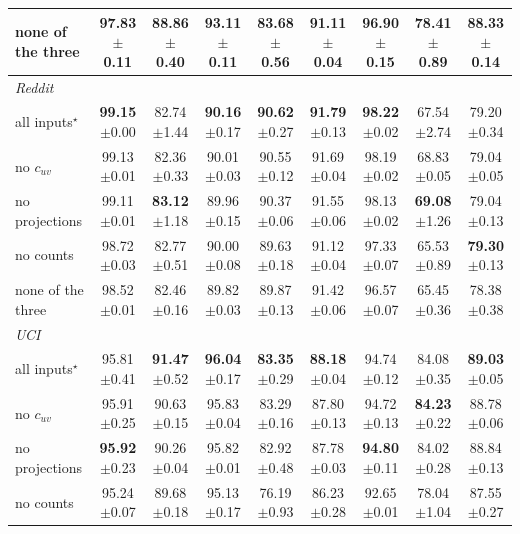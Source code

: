 \begin{table}[p]
\begin{tabular}{lcccccccc}
none of the three & 97.83{\tiny$\pm$0.11} & 88.86{\tiny$\pm$0.40} & 93.11{\tiny$\pm$0.11} & 83.68{\tiny$\pm$0.56} & 91.11{\tiny$\pm$0.04} & 96.90{\tiny$\pm$0.15} & 78.41{\tiny$\pm$0.89} & 88.33{\tiny$\pm$0.14} \\
\midrule
\multicolumn{9}{l}{\textit{Reddit}} \\
all inputs$^\star$ & \textbf{99.15}{\tiny$\pm$0.00} & 82.74{\tiny$\pm$1.44} & \textbf{90.16}{\tiny$\pm$0.17} & \textbf{90.62}{\tiny$\pm$0.27} & \textbf{91.79}{\tiny$\pm$0.13} & \textbf{98.22}{\tiny$\pm$0.02} & 67.54{\tiny$\pm$2.74} & 79.20{\tiny$\pm$0.34} \\
no $c_{uv}$ & 99.13{\tiny$\pm$0.01} & 82.36{\tiny$\pm$0.33} & 90.01{\tiny$\pm$0.03} & 90.55{\tiny$\pm$0.12} & 91.69{\tiny$\pm$0.04} & 98.19{\tiny$\pm$0.02} & 68.83{\tiny$\pm$0.05} & 79.04{\tiny$\pm$0.05} \\
no projections & 99.11{\tiny$\pm$0.01} & \textbf{83.12}{\tiny$\pm$1.18} & 89.96{\tiny$\pm$0.15} & 90.37{\tiny$\pm$0.06} & 91.55{\tiny$\pm$0.06} & 98.13{\tiny$\pm$0.02} & \textbf{69.08}{\tiny$\pm$1.26} & 79.04{\tiny$\pm$0.13} \\
no counts & 98.72{\tiny$\pm$0.03} & 82.77{\tiny$\pm$0.51} & 90.00{\tiny$\pm$0.08} & 89.63{\tiny$\pm$0.18} & 91.12{\tiny$\pm$0.04} & 97.33{\tiny$\pm$0.07} & 65.53{\tiny$\pm$0.89} & \textbf{79.30}{\tiny$\pm$0.13} \\
none of the three & 98.52{\tiny$\pm$0.01} & 82.46{\tiny$\pm$0.16} & 89.82{\tiny$\pm$0.03} & 89.87{\tiny$\pm$0.13} & 91.42{\tiny$\pm$0.06} & 96.57{\tiny$\pm$0.07} & 65.45{\tiny$\pm$0.36} & 78.38{\tiny$\pm$0.38} \\
\midrule
\multicolumn{9}{l}{\textit{UCI}} \\
all inputs$^\star$ & 95.81{\tiny$\pm$0.41} & \textbf{91.47}{\tiny$\pm$0.52} & \textbf{96.04}{\tiny$\pm$0.17} & \textbf{83.35}{\tiny$\pm$0.29} & \textbf{88.18}{\tiny$\pm$0.04} & 94.74{\tiny$\pm$0.12} & 84.08{\tiny$\pm$0.35} & \textbf{89.03}{\tiny$\pm$0.05} \\
no $c_{uv}$ & 95.91{\tiny$\pm$0.25} & 90.63{\tiny$\pm$0.15} & 95.83{\tiny$\pm$0.04} & 83.29{\tiny$\pm$0.16} & 87.80{\tiny$\pm$0.13} & 94.72{\tiny$\pm$0.13} & \textbf{84.23}{\tiny$\pm$0.22} & 88.78{\tiny$\pm$0.06} \\
no projections & \textbf{95.92}{\tiny$\pm$0.23} & 90.26{\tiny$\pm$0.04} & 95.82{\tiny$\pm$0.01} & 82.92{\tiny$\pm$0.48} & 87.78{\tiny$\pm$0.03} & \textbf{94.80}{\tiny$\pm$0.11} & 84.02{\tiny$\pm$0.28} & 88.84{\tiny$\pm$0.13} \\
no counts & 95.24{\tiny$\pm$0.07} & 89.68{\tiny$\pm$0.18} & 95.13{\tiny$\pm$0.17} & 76.19{\tiny$\pm$0.93} & 86.23{\tiny$\pm$0.28} & 92.65{\tiny$\pm$0.01} & 78.04{\tiny$\pm$1.04} & 87.55{\tiny$\pm$0.27} \\

\end{tabular}
\end{table}
